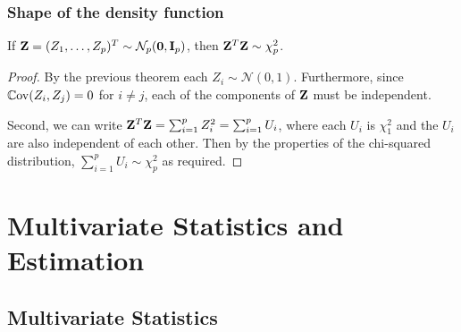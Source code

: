 \documentclass[10pt, a4paper]{article}
\begin{document}
\subsubsection{Shape of the density function}
\begin{proposition}
    If $\mathbf{Z} = (Z_1, \dotsc, Z_p) ^ T \sim \mathcal{N}_p(\mathbf{0}, \mathbf{I}_p)$,
    then $\mathbf{Z} ^ T\mathbf{Z} \sim \chi_p ^ 2$.

    \begin{proof}
        By the previous theorem each $Z_i \sim \mathcal{N}(0, 1)$.
        Furthermore,
        since $\mathbb{C}\mathrm{ov}(Z_i, Z_j) = 0$ for $i \neq j$,
        each of the components of $\mathbf{Z}$ must be independent.

        Second,
        we can write $\mathbf{Z} ^ T\mathbf{Z} = \sum_{i = 1}^{p}Z_i ^ 2 = \sum_{i = 1}^{p}U_{i}$,
        where each $U_i$ is $\chi_1 ^ 2$ and the $U_i$ are also independent of each other.
        Then by the properties of the chi-squared distribution,
        $\sum_{i = 1}^{p}U_i \sim \chi_p ^ 2$ as required.
    \end{proof}
\end{proposition}

\newpage

\section{Multivariate Statistics and Estimation}

\subsection{Multivariate Statistics}
\end{document}
